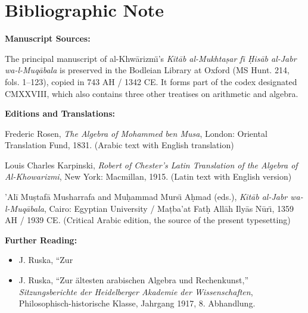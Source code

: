\documentclass[11pt,a4paper,openany,oneside]{book}
\begin{document}
\newpage

\chapter*{Bibliographic Note}

\begin{small}
\textbf{Manuscript Sources:}

The principal manuscript of al-Khw\=arizm\"{\i}'s \textit{Kit\=ab al-Mukhta\d{s}ar
f\"{\i} \d{H}is\=ab al-Jabr wa-l-Muq\=abala} is preserved in the Bodleian
Library at Oxford (MS Hunt. 214, fols. 1--123), copied in 743 AH / 1342 CE.
It forms part of the codex designated CMXXVIII, which also contains three
other treatises on arithmetic and algebra.

\vspace{0.3cm}

\textbf{Editions and Translations:}

\begin{enumerate}[label={[\arabic*]},leftmargin=2em]
  \item Frederic Rosen, \textit{The Algebra of Mohammed ben Musa}, London:
  Oriental Translation Fund, 1831. (Arabic text with English translation)
  
  \item Louis Charles Karpinski, \textit{Robert of Chester's Latin
  Translation of the Algebra of Al-Khowarizmi}, New York: Macmillan, 1915.
  (Latin text with English version)
  
  \item 'Al\=i Mu\d{s}taf\=a Musharrafa and Mu\d{h}ammad Murs\"{\i} A\d{h}mad
  (eds.), \textit{Kit\=ab al-Jabr wa-l-Muq\=abala}, Cairo: Egyptian
  University / Ma\d{t}ba'at Fat\d{h} All\=ah Ily\=as N\=ur\"{\i}, 1359 AH /
  1939 CE. (Critical Arabic edition, the source of the present typesetting)
\end{enumerate}

\vspace{0.3cm}

\textbf{Further Reading:}

\begin{itemize}[leftmargin=2em]
  \item J. Ruska, ``Zur \  \item J. Ruska, ``Zur {\"a}ltesten arabischen Algebra und Rechenkunst,''
  \textit{Sitzungsberichte der Heidelberger Akademie der Wissenschaften},
  Philosophisch-historische Klasse, Jahrgang 1917, 8. Abhandlung.
  

\end{itemize}
\end{small}
\end{document}
